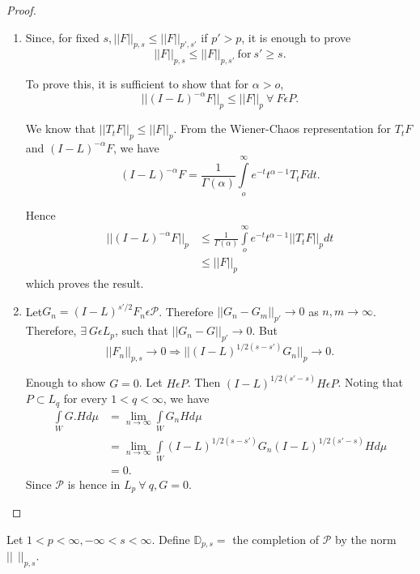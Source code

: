 \begin{proof}
\begin{enumerate}
\renewcommand{\theenumi}{\roman{enumi}}
\renewcommand{\labelenumi}{(\theenumi)}
\item Since, for fixed $s, || F ||_{p,s} \leq || F ||_{p',s'}$ if $p'
  > p$, it is enough to prove 
  $$ 
  || F ||_{p,s} \leq || F ||_{p,s'} ~\text{for}~ s' \geq s.
  $$

To prove this, it is sufficient to show that for $\alpha > o$,
$$
|| (I - L)^{-\alpha}F||_p \leq || F||_p ~\forall~ F \epsilon  P.
$$

We know that $|| T_t F ||_p \leq || F ||_p$. From the Wiener-Chaos
representation for $T_t F$ and $(I - L)^{-\alpha} F$, we have  
$$
(I - L)^{-\alpha}F = \frac{1}{\Gamma (\alpha)} \int\limits_{o}^{\infty}
e^{-t} t^{\alpha -1} T_t F dt. 
$$

Hence
\begin{align*}
  || (I-L)^{-\alpha} F||_p & \leq \frac{1}{\Gamma (\alpha)}
  \int\limits_{o}^{\infty} e^{-t} t^{\alpha -1} || T_t F||_p dt\\ 
  & \leq || F || _p
\end{align*}
which proves the result.

\item  Let\pageoriginale $G_n = (I-L)^{s' /2} F_n \epsilon
  \mathcal{P}$. Therefore  $|| G_n - G_m ||_{p'} \to 0$ as $n, m \to
  \infty$. Therefore, $\exists ~G 
\epsilon  L_p$, such that $|| G_n - G||_{p'} \to 0$. But 
$$
|| F_n ||_{p,s}\to 0 \Rightarrow || (I -L)^{1/2 (s-s')} G_n ||_p \to 0.
$$

Enough to show $G=0$. Let $H \epsilon  P$. Then $(I-L)^{1/2 (s' -s)}
H \epsilon  P$. Noting that $P \subset L_q$ for every $1< q<
\infty$, we have 
\begin{align*}
  \int\limits_W G.H d\mu & = \lim_{n \to \infty} \int\limits_{W} G_n H d\mu \\
  & = \lim_{n \to \infty} \int\limits_{W} (I - L )^{1/2 (s-s')} G_n
  (I- L)^{1/2 (s'-s)} H d \mu\\ 
  & = 0.
\end{align*}
Since $\mathcal{P}$ is hence in $L_p ~\forall~ q, G =0$.
\end{enumerate}
\end{proof}

\begin{definition}%
Let $1 < p < \infty, - \infty < s < \infty$. Define
$\mathbb{D}_{p,s}= $ the completion of $\mathcal{P}$ by the norm
$||~~||_{p,s}$. 
\end{definition} 

